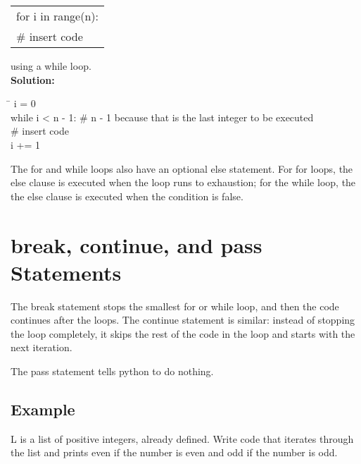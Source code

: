 \documentclass{article}
\newcommand{\icode}[1]{{\ttfamily #1}}
\newenvironment{code}{\begin{tcolorbox}\ttfamily}{\end{tcolorbox}}
\begin{document}
\begin{center} \ttfamily
	\begin{tabular}{|l}
		for i in range(n):\\
		\hspace{2 em}\# insert code
	\end{tabular}
\end{center}
using a while loop.\\
\noindent\textbf{Solution:}
\begin{code}
	\begin{tabbing}
		\hspace{3.5 in}\=\hspace{3.25 in} \kill
		i = 0\\
		while i < n - 1: \hspace{1 cm}\# n - 1 because that is the last integer to be executed\\
		\hspace{2 em}\# insert code\\
		\hspace{2 em}i += 1
	\end{tabbing}
\end{code}
\vspace{.5 cm}
The \icode{for} and \icode{while} loops also have an optional \icode{else} statement. For \icode{for} loops, the \icode{else} clause is executed when the loop runs to exhaustion; for the \icode{while} loop, the the \icode{else} clause is executed when the condition is false.
\section{\icode{break}, \icode{continue}, and \icode{pass} Statements}
The \icode{break} statement stops the smallest \icode{for} or \icode{while} loop, and then the code continues after the loops. The \icode{continue} statement is similar: instead of stopping the loop completely, it skips the rest of the code in the loop and starts with the next iteration.

The \icode{pass} statement tells python to do nothing.

\subsection{Example}
\icode{L} is a list of positive integers, already defined. Write code that iterates through the list and prints \icode{even} if the number is even and \icode{odd} if the number is odd.
\end{document}
